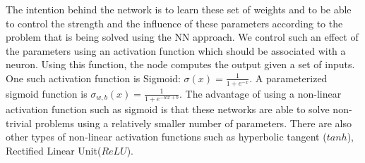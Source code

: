 The intention behind the network is to learn these set of weights and to be able to control the strength and the influence of these parameters according to the problem that is being solved using the NN approach. We control such an effect of the parameters using an activation function which should be associated with a neuron. Using this function, the node computes the output given a set of inputs. One such activation function is Sigmoid: $\sigma(x) = \frac{1}{1+e^{-x}}$. A parameterized sigmoid function is $\sigma_{w,b}(x) = \frac{1}{1+e^{-wx+b}}$. The advantage of using a non-linear activation function such as sigmoid is that these networks are able to solve non-trivial problems using a relatively smaller number of parameters. 
There are also other types of non-linear activation functions such as hyperbolic tangent  ($tanh$), Rectified Linear Unit($ReLU$). 


